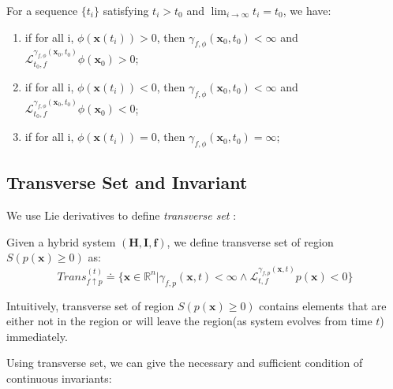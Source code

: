 \documentclass{article}
\begin{document}
\begin{Corollary}
\label{cor:lieDeri}
For a sequence $\{ t_i \}$  satisfying $t_i > t_0$ and $\lim_{i \to \infty} t_i = t_0$, we have: 
\begin{enumerate}
	\item if for all i, $\phi(\boldsymbol{x}(t_i)) > 0$, then $\gamma_{f, \phi}(\boldsymbol{x}_0, t_0) < \infty$ and $\mathcal{L}_{t_0, f}^{\gamma_{f, \phi}(\boldsymbol{x}_0, t_0)} \phi (\boldsymbol{x}_0) > 0$; 
	\item if for all i, $\phi(\boldsymbol{x}(t_i)) < 0$, then $\gamma_{f, \phi}(\boldsymbol{x}_0, t_0) < \infty$ and $\mathcal{L}_{t_0, f}^{\gamma_{f, \phi}(\boldsymbol{x}_0, t_0)} \phi (\boldsymbol{x}_0) < 0$;
	\item if for all i, $\phi(\boldsymbol{x}(t_i)) = 0$, then $\gamma_{f, \phi}(\boldsymbol{x}_0, t_0) = \infty$; 
\end{enumerate}
\end{Corollary}

\subsection{Transverse Set and Invariant}
We use Lie derivatives to define \emph{transverse set} :

\begin{Definition}
\label{def:trans}
	Given a hybrid system $(\boldsymbol{H}, \boldsymbol{I}, \boldsymbol{f})$, we define transverse set of region $S(p(\boldsymbol{x}) \geq 0)$ as: 
	\begin{equation*}
		Trans_{f \uparrow p}^{(t)} \doteq \{\boldsymbol{x} \in \mathbb{R}^n | \gamma_{f, p}(\boldsymbol{x}, t) < \infty \wedge \mathcal{L}_{t, f}^{\gamma_{f, p}(\boldsymbol{x}, t)} p(\boldsymbol{x}) < 0 \}
	\end{equation*}
\end{Definition}

Intuitively, transverse set of region $S(p(\boldsymbol{x}) \geq 0)$ contains elements that are either not in the region or will leave the region(as system evolves from time $t$) immediately.

Using transverse set, we can give the necessary and sufficient condition of continuous invariants:
\end{document}

